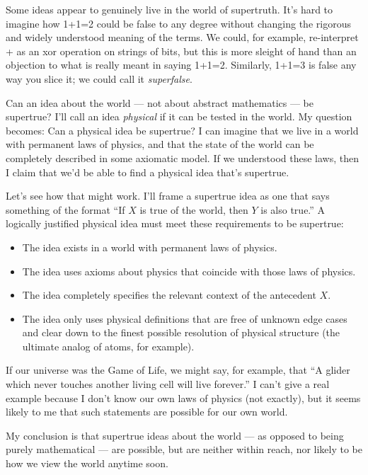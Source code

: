 \documentclass[11pt, oneside]{article}
\begin{document}
Some ideas appear to genuinely live in the world of supertruth. It's hard to
imagine how 1+1=2 could be false to any degree without changing the rigorous and
widely understood meaning of the terms. We could, for example,
re-interpret + as an xor operation on strings of
bits, but this is more sleight of hand than an objection to what is
really meant in saying 1+1=2. Similarly, 1+1=3 is false any way you slice it; we
could call it {\em superfalse}.

Can an idea about the world --- not about abstract mathematics ---
be supertrue?
I'll call an idea {\em physical} if it can be tested in the world.
My question becomes: Can a physical idea be supertrue?
I can imagine that we live in a world with permanent laws of physics, and that
the
state of the world can be completely described in some axiomatic
model.
If we understood these laws, then I claim that we'd be able to find
a physical idea that's supertrue.

Let's see how that might work.
I'll frame a supertrue idea as one that says something of the format ``If $X$ is
true of the world, then $Y$ is also true.''
A logically justified physical idea must meet these
requirements to be supertrue:
\begin{itemize}
    \item The idea exists in a world with permanent laws of physics.
    \item The idea uses axioms about physics that coincide with those laws of
        physics.
    \item The idea completely specifies the relevant context of the antecedent
        $X$.
    \item The idea only uses physical definitions that are free of unknown edge
        cases and clear down to
        the finest possible resolution of physical structure (the
        ultimate analog of atoms, for example).
\end{itemize}
If our universe was the Game of Life, we might say, for example, that
``A glider which never touches another living cell will live forever.''
I can't give a real example because I don't know our own laws of physics (not
exactly), but it
seems likely to me that such statements are possible for our own world.

My conclusion is
that supertrue ideas about the world --- as opposed to being purely
mathematical --- are possible, but are neither within reach,
nor likely to be how we view the world anytime soon.
\end{document}
